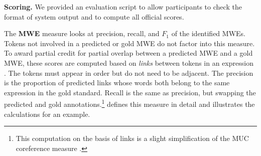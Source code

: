 \documentclass[11pt,letterpaper]{article}
\newcommand{\ensuretext}[1]{#1}
\newcommand{\nssmarker}{\ensuretext{\textcolor{magenta}{\ensuremath{^{\textsc{NS}}_{\textsc{S}}}}}}
\newcommand{\dhmarker}{\ensuretext{\textcolor{red}{\ensuremath{^{\textsc{D}}_{\textsc{H}}}}}}
\newcommand{\arkcomment}[3]{\ensuretext{\textcolor{#3}{[#1 #2]}}}
\newcommand{\nss}[1]{\arkcomment{\nssmarker}{#1}{magenta}}
\newcommand{\dirk}[1]{\arkcomment{\dhmarker}{#1}{red}}
\newcommand{\longversion}[1]{#1} %
\begin{document}

\textbf{Scoring.}
We provided an evaluation script to allow participants to check the format of system output and to compute all official scores.

The \textbf{MWE} measure looks at precision, recall, and $F_1$ 
of the identified MWEs. Tokens not involved in a predicted or gold MWE
do not factor into this measure. 
To award partial credit for partial overlap between a predicted MWE 
and a gold MWE, these scores are computed based on \emph{links} between tokens in an expression \citep{schneider-14}. The tokens must appear in order but do not need to be adjacent.
The precision is the proportion of predicted links whose words 
both belong to the same expression in the gold standard. 
Recall is the same as precision, but swapping the predicted and gold annotations.\longversion{\footnote{This computation on the basis of links 
is a slight simplification of the MUC coreference measure \citep{vilain-95}.}}
 defines this measure in detail and illustrates the calculations for an example.

\end{document}
